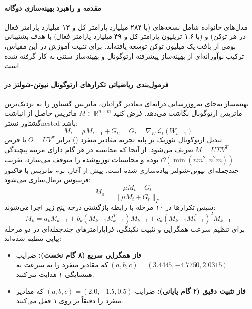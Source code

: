 \item {}

\paragraph*{مقدمه و راهبرد بهینه‌سازی دوگانه}
مدل‌های خانواده  \cite{deepseek2025v4} شامل نسخه‌های  (با ۲۸۴ میلیارد پارامتر کل و ۱۳ میلیارد پارامتر فعال در هر توکن) و  (با ۱.۶ تریلیون پارامتر کل و ۴۹ میلیارد پارامتر فعال) با هدف پشتیبانی بومی از بافت یک میلیون توکن توسعه یافته‌اند. برای تثبیت آموزش در این مقیاس، ترکیب نوآورانه‌ای از بهینه‌ساز پیشرفته ارتوگونال  \cite{jordan2024muon, liu2025muon} و بهینه‌ساز سنتی  به کار گرفته شده است.

\paragraph*{فرمول‌بندی ریاضیاتی تکرارهای ارتوگونال نیوتن-شولتز در }
بهینه‌ساز  به‌جای به‌روزرسانی درایه‌ای مقادیر گرادیان، ماتریس گشتاور را به نزدیک‌ترین ماتریس ارتوگونال نگاشت می‌دهد. فرض کنید $M \in \mathbb{R}^{n \times m}$ ماتریس حاصل از انباشت گشتاور نسترnested باشد:
\begin{equation}
    M_t = \mu M_{t-1} + G_t, \quad G_t = \nabla_W \mathcal{L}_t(W_{t-1})
\end{equation}
تبدیل ارتوگونال تئوریک بر پایه تجزیه مقادیر منفرد () برابر $O = U V^T$ با فرض $M = U \Sigma V^T$ تعریف می‌شود. از آنجا که محاسبه  در هر گام دارای مرتبه پیچیدگی $\mathcal{O}(\min(nm^2, n^2m))$ بوده و محاسبات توزیع‌شده را متوقف می‌سازد، تقریب چندجمله‌ای نیوتن-شولتز پیاده‌سازی شده است. پیش از آغاز، نرم ماتریس با فاکتور فربنیوس نرمال‌سازی می‌شود:
\begin{equation}
    M_0 = \frac{\mu M_t + G_t}{\|\mu M_t + G_t\|_F}
\end{equation}
سپس تکرارها در ۱۰ مرحله با رابطه بازگشتی درجه پنج زیر اجرا می‌شوند:
\begin{equation}
    M_k = a_k M_{k-1} + b_k (M_{k-1} M_{k-1}^T) M_{k-1} + c_k (M_{k-1} M_{k-1}^T)^2 M_{k-1}
\end{equation}
برای تنظیم سرعت همگرایی و تثبیت تکینگی، فراپارامترهای چندجمله‌ای در دو مرحله پیاپی تنظیم شده‌اند:
\begin{itemize}
    \item \textbf{فاز همگرایی سریع (۸ گام نخست):} ضرایب $(a, b, c) = (3.4445, -4.7750, 2.0315)$ که مقادیر منفرد را به سرعت به همسایگی ۱ هدایت می‌کنند.
    \item \textbf{فاز تثبیت دقیق (۲ گام پایانی):} ضرایب $(a, b, c) = (2.0, -1.5, 0.5)$ که مقادیر منفرد را دقیقاً بر روی ۱ قفل می‌کنند.
\end{itemize}
